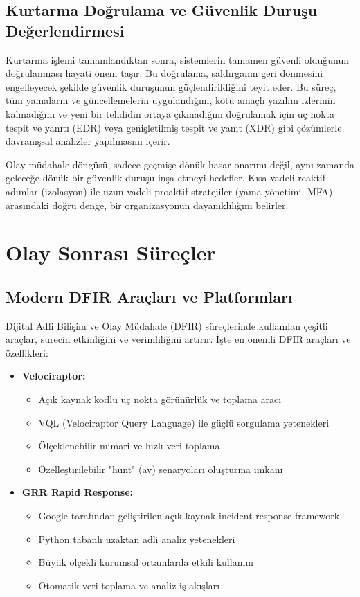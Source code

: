 \begin{itemize}
\begin{itemize}
\subsection{Kurtarma Doğrulama ve Güvenlik Duruşu Değerlendirmesi}

Kurtarma işlemi tamamlandıktan sonra, sistemlerin tamamen güvenli olduğunun doğrulanması hayati önem taşır. Bu doğrulama, saldırganın geri dönmesini engelleyecek şekilde güvenlik duruşunun güçlendirildiğini teyit eder. Bu süreç, tüm yamaların ve güncellemelerin uygulandığını, kötü amaçlı yazılım izlerinin kalmadığını ve yeni bir tehdidin ortaya çıkmadığını doğrulamak için uç nokta tespit ve yanıtı (EDR) veya genişletilmiş tespit ve yanıt (XDR) gibi çözümlerle davranışsal analizler yapılmasını içerir.

Olay müdahale döngüsü, sadece geçmişe dönük hasar onarımı değil, aynı zamanda geleceğe dönük bir güvenlik duruşu inşa etmeyi hedefler. Kısa vadeli reaktif adımlar (izolasyon) ile uzun vadeli proaktif stratejiler (yama yönetimi, MFA) arasındaki doğru denge, bir organizasyonun dayanıklılığını belirler.

\section{Olay Sonrası Süreçler}

\subsection{Modern DFIR Araçları ve Platformları}

Dijital Adli Bilişim ve Olay Müdahale (DFIR) süreçlerinde kullanılan çeşitli araçlar, sürecin etkinliğini ve verimliliğini artırır. İşte en önemli DFIR araçları ve özellikleri:

\begin{itemize}
    \item \textbf{Velociraptor:}
    \begin{itemize}
        \item Açık kaynak kodlu uç nokta görünürlük ve toplama aracı
        \item VQL (Velociraptor Query Language) ile güçlü sorgulama yetenekleri
        \item Ölçeklenebilir mimari ve hızlı veri toplama
        \item Özelleştirilebilir "hunt" (av) senaryoları oluşturma imkanı
    \end{itemize}

    \item \textbf{GRR Rapid Response:}
    \begin{itemize}
        \item Google tarafından geliştirilen açık kaynak incident response framework
        \item Python tabanlı uzaktan adli analiz yetenekleri
        \item Büyük ölçekli kurumsal ortamlarda etkili kullanım
        \item Otomatik veri toplama ve analiz iş akışları
    \end{itemize}


\end{itemize}
\end{itemize}
\end{itemize}
